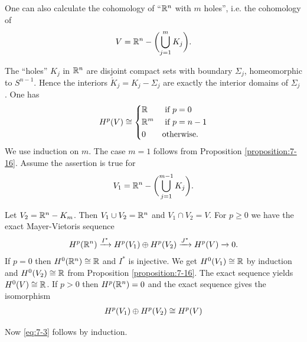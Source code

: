 \begin{example}\label{example:7-18}
  One can also calculate the cohomology of ``${\mathbb{R}}^n$ with $m$ holes'', i.e. the cohomology of
  \begin{align*}
    V = {\mathbb{R}}^n - \biggl(\bigcup_{j=1}^m K_j\biggr).
  \end{align*}

  The ``holes'' $K_j$ in ${\mathbb{R}}^n$ are disjoint compact sets with boundary $\Sigma_j$, homeomorphic
  to $S^{n-1}$. Hence the interiors $\mathring{K}_j = K_j - \Sigma_j$ are exactly the interior 
  domains of $\Sigma_j$. One has
  \begin{align}\label{eq:7-3}
    H^p(V) \cong \left\{\begin{aligned}
      & {\mathbb{R}} && \text{ if } p = 0 \\
      & {\mathbb{R}}^m && \text{ if } p = n-1 \\
      & 0 && \text{otherwise}.
    \end{aligned}\right.
  \end{align}
  We use induction on $m$. The case $m = 1$ follows from Proposition \ref{proposition:7-16}. Assume
  the assertion is true for 
  \begin{align*}
    V_1 = {\mathbb{R}}^n - \biggl(\bigcup_{j=1}^{m-1} K_j\biggr).
  \end{align*}

  Let $V_2 = {\mathbb{R}}^n -K_m$. Then $V_1\cup V_2 = {\mathbb{R}}^n$ and $V_1\cap V_2=V$. For $p\ge 0$ we have 
  the exact Mayer-Vietoris sequence
  \begin{align*}
    H^p(\RR^n) \xra[I^*] H^p(V_1)\oplus H^p(V_2) \xra[J^*] H^p(V) \xra 0.
  \end{align*}
  If $p=0$ then $H^0({\mathbb{R}}^n)\cong {\ensuremath{\mathbb{R}}}$ and $I^*$ is injective. We get $H^0(V_1)\cong{\ensuremath{\mathbb{R}}}$ by 
  induction and $H^0(V_2)\cong {\ensuremath{\mathbb{R}}}$ from Proposition \ref{proposition:7-16}. The exact sequence
  yields $H^0(V)\cong {\ensuremath{\mathbb{R}}}$. If $p> 0$ then $H^p({\mathbb{R}}^n) = 0$ and the exact sequence gives the 
  isomorphism 
  \begin{align*}
    H^p(V_1)\oplus H^p(V_2) \cong H^p(V)
  \end{align*}

  Now \eqref{eq:7-3} follows by induction.
\end{example}